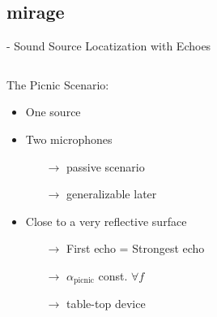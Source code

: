 \subsection{mirage}

\begin{frame}{\mirage - Sound Source Locatization with Echoes}

    \vspace*{5mm}
    \begin{columns}

        \begin{column}{0.5\textwidth}
            \begin{block}{The \alert{Picnic} Scenario:}
                \begin{itemize}
                    \small
                    \item One source
                    \item Two microphones
                    \begin{itemize}
                        \item[$\rightarrow$] passive scenario
                        \item[$\rightarrow$] generalizable later
                    \end{itemize}
                    \item Close to a very reflective surface
                    \begin{itemize}
                        \item[$\rightarrow$] First echo = Strongest echo
                        \item[$\rightarrow$] $\alpha_\text{picnic}$ const. $\forall f$
                        \item[$\rightarrow$] table-top device
                    \end{itemize}
                \end{itemize}
            \end{block}
        \end{column}

        \begin{column}{0.5\textwidth}
            \centering
        \end{column}
    \end{columns}


\end{frame}
